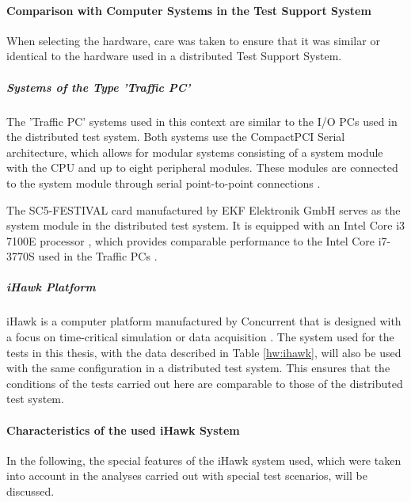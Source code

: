 \paragraph{Comparison with Computer Systems in the Test Support System}
When selecting the hardware, care was taken to ensure that it was similar or identical to the hardware used in a distributed Test Support System.

\subparagraph{Systems of the Type 'Traffic PC'}
The 'Traffic PC' systems used in this context are similar to the I/O PCs used in the distributed test system. Both systems use the CompactPCI Serial architecture, which allows for modular systems consisting of a system module with the CPU and up to eight peripheral modules. These modules are connected to the system module through serial point-to-point connections \cite{setup01}.

The SC5-FESTIVAL card manufactured by EKF Elektronik GmbH serves as the system module in the distributed test system. It is equipped with an Intel Core i3 7100E processor \cite{setup02}, which provides comparable performance to the Intel Core i7-3770S used in the Traffic PCs \cite{setup03}.

\subparagraph{iHawk Platform}
iHawk is a computer platform manufactured by Concurrent that is designed with a focus on time-critical simulation or data acquisition \cite{setup04}. The system used for the tests in this thesis, with the data described in Table \ref{hw:ihawk}, will also be used with the same configuration in a distributed test system. This ensures that the conditions of the tests carried out here are comparable to those of the distributed test system.


\paragraph{Characteristics of the used iHawk System}
In the following, the special features of the iHawk system used, which were taken into account in the analyses carried out with special test scenarios, will be discussed.

